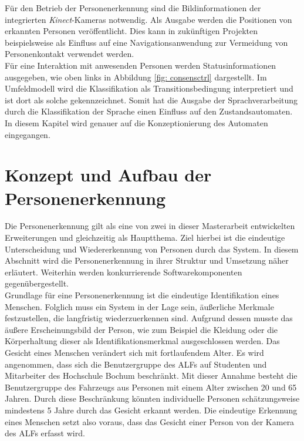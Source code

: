 	Für den Betrieb der Personenerkennung sind die Bildinformationen der integrierten \textit{Kinect}-Kameras notwendig. Als Ausgabe werden die Positionen von erkannten Personen veröffentlicht. Dies kann in zukünftigen Projekten beispielsweise als Einfluss auf eine Navigationsanwendung zur Vermeidung von Personenkontakt verwendet werden.\\
	
	
	
	Für eine Interaktion mit anwesenden Personen werden Statusinformationen ausgegeben, wie oben links in Abbildung \ref{fig: consensctrl} dargestellt. Im Umfeldmodell wird die Klassifikation als Transitionsbedingung interpretiert und ist dort als solche gekennzeichnet. Somit hat die Ausgabe der Sprachverarbeitung durch die Klassifikation der Sprache einen Einfluss auf den Zustandsautomaten. In diesem Kapitel wird genauer auf die Konzeptionierung des Automaten eingegangen.\\
		

	
	
	
	\section{Konzept und Aufbau der Personenerkennung}
	\label{sec: Konzept Personenerkennung}
	
	Die Personenerkennung gilt als eine von zwei in dieser Masterarbeit entwickelten Erweiterungen und gleichzeitig als Hauptthema. Ziel hierbei ist die eindeutige Unterscheidung und Wiedererkennung von Personen durch das System. In diesem Abschnitt wird die Personenerkennung in ihrer Struktur und Umsetzung näher erläutert. Weiterhin werden konkurrierende Softwarekomponenten gegenübergestellt.\\
	
	Grundlage für eine Personenerkennung ist die eindeutige Identifikation eines Menschen. Folglich muss ein System in der Lage sein, äußerliche Merkmale festzustellen, die langfristig wiederzuerkennen sind. Aufgrund dessen musste das äußere Erscheinungsbild der Person, wie zum Beispiel die Kleidung oder die Körperhaltung dieser als Identifikationsmerkmal ausgeschlossen werden. Das Gesicht eines Menschen verändert sich mit fortlaufendem Alter. Es wird angenommen, dass sich die Benutzergruppe des ALFs auf Studenten und Mitarbeiter des Hochschule Bochum beschränkt. Mit dieser Annahme besteht die Benutzergruppe des Fahrzeugs aus Personen mit einem Alter zwischen 20 und 65 Jahren. Durch diese Beschränkung könnten individuelle Personen schätzungsweise mindestens 5 Jahre durch das Gesicht erkannt werden. Die eindeutige Erkennung eines Menschen setzt also voraus, dass das Gesicht einer Person von der Kamera des ALFs erfasst wird. \\ 
	
